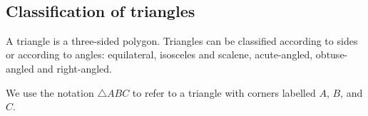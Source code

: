 \\
% 
        \subsection*{Classification of triangles}
A triangle is a three-sided polygon. Triangles can be classified according to sides or according to angles: equilateral, isosceles and scalene, acute-angled, obtuse-angled and right-angled. \par 
We use the notation $\triangle ABC$ to
refer to a triangle with corners labelled $A$,
$B$, and $C$.\par 
{}
